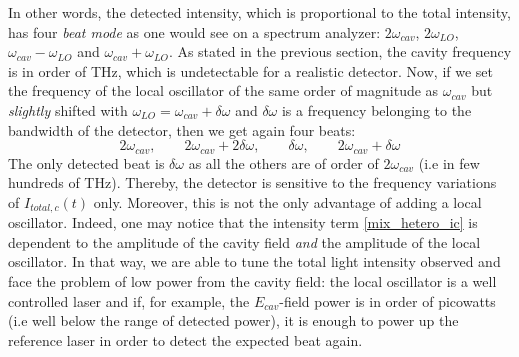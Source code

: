 \documentclass[11pt]{report}
\begin{document}
In other words, the detected intensity, which is proportional to the total intensity, has four \textit{beat mode} as one would see on a spectrum analyzer: $2\omega_{cav}$, $2\omega_{LO}$, $\omega_{cav} - \omega_{LO}$ and $\omega_{cav} + \omega_{LO}$. As stated in the previous section, the cavity frequency is in order of THz, which is undetectable for a realistic detector. Now, if we set the frequency of the local oscillator of the same order of magnitude as $\omega_{cav}$ but \textit{slightly} shifted with $\omega_{LO} = \omega_{cav} + \delta\omega$ and $\delta\omega$ is a frequency belonging to the bandwidth of the detector, then we get again four beats:
\begin{equation}
\label{list_comp_light_mix}
2\omega_{cav}, \quad\quad 2\omega_{cav} + 2\delta\omega, \quad\quad \delta\omega, \quad\quad 2\omega_{cav} + \delta\omega
\end{equation}
The only detected beat is $\delta\omega$ as all the others are of order of $2\omega_{cav}$ (i.e in few hundreds of THz). Thereby, the detector is sensitive to the frequency variations of $I_{total,c}(t)$ only. Moreover, this is not the only advantage of adding a local oscillator. Indeed, one may notice that the intensity term \eqref{mix_hetero_ic} is dependent to the amplitude of the cavity field \textit{and} the amplitude of the local oscillator. In that way, we are able to tune the total light intensity observed and face the problem of low power from the cavity field: the local oscillator is a well controlled laser and if, for example, the $E_{cav}$-field power is in order of picowatts (i.e well below the range of detected power), it is enough to power up the reference laser in order to detect the expected beat again.
\end{document}
